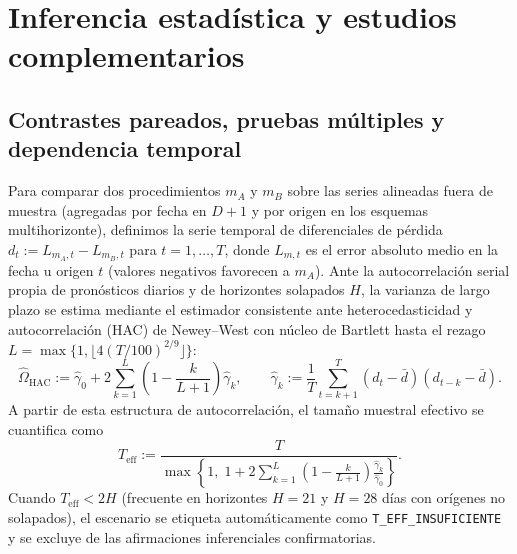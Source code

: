 \section{Inferencia estadística y estudios complementarios}\label{sec:inferencia}

\subsection{Contrastes pareados, pruebas múltiples y dependencia temporal}

Para comparar dos procedimientos $m_A$ y $m_B$ sobre las series alineadas fuera de muestra (agregadas por fecha en $D+1$ y por origen en los esquemas multihorizonte), definimos la serie temporal de diferenciales de pérdida $d_t := L_{m_A, t} - L_{m_B, t}$ para $t = 1,\dots,T$, donde $L_{m,t}$ es el error absoluto medio en la fecha u origen $t$ (valores negativos favorecen a $m_A$). Ante la autocorrelación serial propia de pronósticos diarios y de horizontes solapados $H$, la varianza de largo plazo se estima mediante el estimador consistente ante heterocedasticidad y autocorrelación (HAC) de Newey--West \cite{newey1987} con núcleo de Bartlett hasta el rezago $L = \max\{1, \lfloor 4(T/100)^{2/9} \rfloor\}$:
\begin{equation}
\hat{\Omega}_{\mathrm{HAC}} := \hat{\gamma}_0 + 2\sum_{k=1}^{L}\left(1 - \frac{k}{L+1}\right)\hat{\gamma}_k, \qquad
\hat{\gamma}_k := \frac{1}{T}\sum_{t=k+1}^{T}(d_t - \bar{d})(d_{t-k} - \bar{d}).
\label{eq:hac}
\end{equation}
A partir de esta estructura de autocorrelación, el tamaño muestral efectivo se cuantifica como
\begin{equation}
T_{\mathrm{eff}} := \frac{T}{\max\!\left\{1,\; 1 + 2\sum_{k=1}^{L}\left(1 - \frac{k}{L+1}\right)\frac{\hat{\gamma}_k}{\hat{\gamma}_0}\right\}}.
\end{equation}
Cuando $T_{\mathrm{eff}} < 2H$ (frecuente en horizontes $H=21$ y $H=28$ días con orígenes no solapados), el escenario se etiqueta automáticamente como \texttt{T\_EFF\_INSUFICIENTE} y se excluye de las afirmaciones inferenciales confirmatorias.

